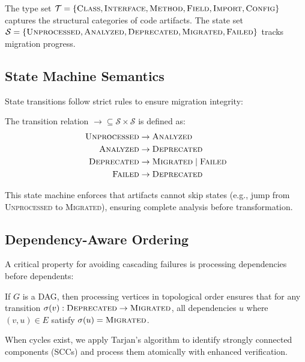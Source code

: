 \documentclass[sigconf,review,anonymous]{acmart}
\begin{document}
The type set $\mathcal{T} = \{\textsc{Class}, \textsc{Interface}, \textsc{Method}, \textsc{Field}, \textsc{Import}, \textsc{Config}\}$ captures the structural categories of code artifacts. The state set $\mathcal{S} = \{\textsc{Unprocessed}, \textsc{Analyzed}, \textsc{Deprecated}, \textsc{Migrated}, \textsc{Failed}\}$ tracks migration progress.

\subsection{State Machine Semantics}

State transitions follow strict rules to ensure migration integrity:

\begin{definition}
The transition relation $\rightarrow \subseteq \mathcal{S} \times \mathcal{S}$ is defined as:
\begin{align}
\textsc{Unprocessed} &\rightarrow \textsc{Analyzed} \\
\textsc{Analyzed} &\rightarrow \textsc{Deprecated} \\
\textsc{Deprecated} &\rightarrow \textsc{Migrated} \mid \textsc{Failed} \\
\textsc{Failed} &\rightarrow \textsc{Deprecated}
\end{align}
\end{definition}

This state machine enforces that artifacts cannot skip states (e.g., jump from \textsc{Unprocessed} to \textsc{Migrated}), ensuring complete analysis before transformation.

\subsection{Dependency-Aware Ordering}

A critical property for avoiding cascading failures is processing dependencies before dependents:

\begin{theorem}
If $G$ is a DAG, then processing vertices in topological order ensures that for any transition $\sigma(v) : \textsc{Deprecated} \rightarrow \textsc{Migrated}$, all dependencies $u$ where $(v, u) \in E$ satisfy $\sigma(u) = \textsc{Migrated}$.
\end{theorem}

When cycles exist, we apply Tarjan's algorithm to identify strongly connected components (SCCs) and process them atomically with enhanced verification.
\end{document}
